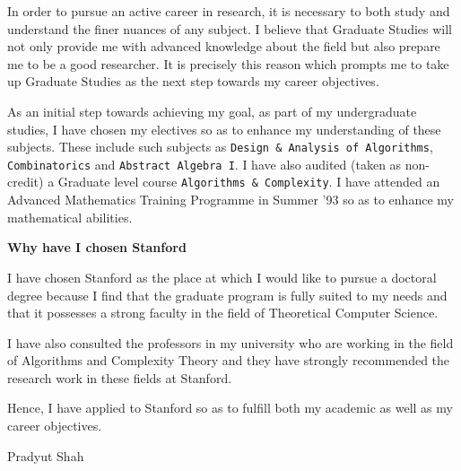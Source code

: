 	In order to pursue an active career in research, it is
necessary to both study and understand the finer nuances of any
subject. I believe that Graduate Studies will not only provide me with
advanced knowledge about the field but also prepare me to be a good
researcher. It is precisely this reason which prompts me to take up
Graduate Studies as the next step towards my career objectives.

\newpage

	As an initial step towards achieving my goal, as part of my
undergraduate studies, I have chosen my electives so as to enhance my
understanding of these subjects. These include such subjects as
{\tt Design \& Analysis of Algorithms}, {\tt Combinatorics} and
{\tt Abstract Algebra I}. I have also audited (taken as non-credit)
a Graduate level course {\tt Algorithms \& Complexity}.
I have attended an Advanced Mathematics Training Programme in
Summer '93 so as to enhance my mathematical abilities.

%

\begin{flushleft}
{\bf Why have I chosen Stanford}
\end{flushleft}

	I have chosen Stanford as the place at which I would
like to pursue a doctoral degree because I find that the graduate
program is fully suited to my needs and that it possesses a strong
faculty in the field of Theoretical Computer Science.

        I have also consulted the professors in my university who are
working in the field of Algorithms and Complexity Theory and they have
strongly recommended the research work in these fields at Stanford.

        Hence, I have applied to Stanford so as to fulfill
both my academic as well as my career objectives.

Pradyut Shah

